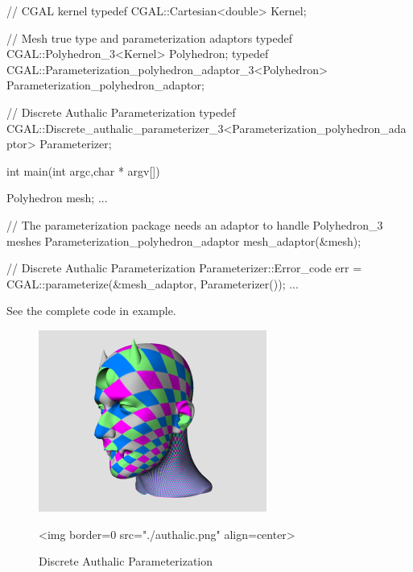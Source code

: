 \begin{ccExampleCode}

// CGAL kernel
typedef CGAL::Cartesian<double>                         Kernel;

// Mesh true type and parameterization adaptors
typedef CGAL::Polyhedron_3<Kernel>                      Polyhedron;
typedef CGAL::Parameterization_polyhedron_adaptor_3<Polyhedron>     
                                                        Parameterization_polyhedron_adaptor;

// Discrete Authalic Parameterization
typedef CGAL::Discrete_authalic_parameterizer_3<Parameterization_polyhedron_adaptor>
                                                        Parameterizer;

int main(int argc,char * argv[])
{
    Polyhedron mesh;
    ...

    // The parameterization package needs an adaptor to handle Polyhedron_3 meshes
    Parameterization_polyhedron_adaptor mesh_adaptor(&mesh);

    // Discrete Authalic Parameterization
    Parameterizer::Error_code err = CGAL::parameterize(&mesh_adaptor, Parameterizer());
    ...
}

\end{ccExampleCode}

See the complete code in  example.

\begin{figure}[bht]
    \begin{center}
        \begin{ccTexOnly}
            \includegraphics{Parameterization/authalic} %
        \end{ccTexOnly}
        \begin{ccHtmlOnly}
            <img border=0 src="./authalic.png" align=center>
        \end{ccHtmlOnly}
        \label{parameterization-fig-authalic}

        \caption{Discrete Authalic Parameterization}
    \end{center}
\end{figure}


